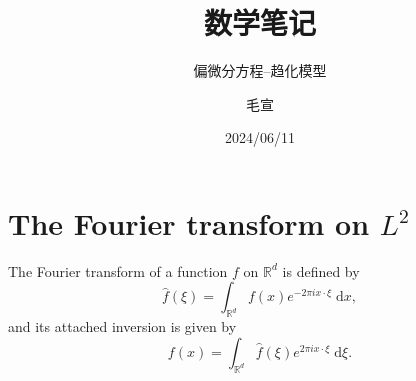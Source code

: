 \documentclass[lang=cn,newtx,10pt,scheme=chinese,device=pad]{elegantbook}
\title{数学笔记}
\subtitle{偏微分方程--趋化模型}
\author{毛宣}
\institute{东南大学数学学院}
\date{2024/06/11}
\newcommand{\dd}{\;\mathrm{d}}
\begin{document}
\maketitle
\frontmatter

\tableofcontents

\mainmatter















\printbibliography[heading=bibintoc, title=\ebibname]
\appendix

\chapter{The Fourier transform on $L^2$}

The Fourier transform of a function $f$ on $\mathbb R^d$ is defined by 
\begin{equation}
  \hat f(\xi) = \int_{\mathbb R^d}f(x)e^{-2\pi ix\cdot\xi}\dd x,
\end{equation}
and its attached inversion is given by 
\begin{equation}
  f(x) = \int_{\mathbb R^d}\hat f(\xi)e^{2\pi ix\cdot\xi}\dd \xi.
\end{equation}
\end{document}
